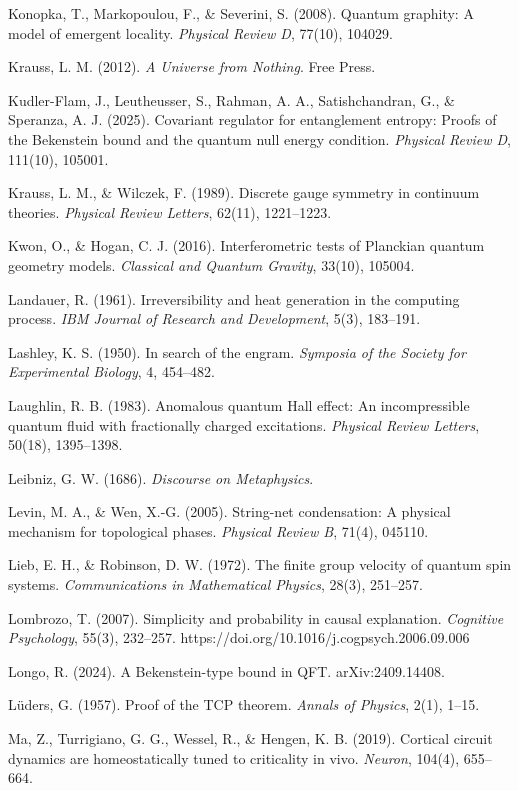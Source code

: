 \documentclass[
]{article}
\begin{document}
Konopka, T., Markopoulou, F., \& Severini, S. (2008). Quantum graphity:
A model of emergent locality. \emph{Physical Review D}, 77(10), 104029.

Krauss, L. M. (2012). \emph{A Universe from Nothing}. Free Press.

Kudler-Flam, J., Leutheusser, S., Rahman, A. A., Satishchandran, G., \&
Speranza, A. J. (2025). Covariant regulator for entanglement entropy:
Proofs of the Bekenstein bound and the quantum null energy condition.
\emph{Physical Review D}, 111(10), 105001.

Krauss, L. M., \& Wilczek, F. (1989). Discrete gauge symmetry in
continuum theories. \emph{Physical Review Letters}, 62(11), 1221--1223.

Kwon, O., \& Hogan, C. J. (2016). Interferometric tests of Planckian
quantum geometry models. \emph{Classical and Quantum Gravity}, 33(10),
105004.

Landauer, R. (1961). Irreversibility and heat generation in the
computing process. \emph{IBM Journal of Research and Development}, 5(3),
183--191.

Lashley, K. S. (1950). In search of the engram. \emph{Symposia of the
Society for Experimental Biology}, 4, 454--482.

Laughlin, R. B. (1983). Anomalous quantum Hall effect: An incompressible
quantum fluid with fractionally charged excitations. \emph{Physical
Review Letters}, 50(18), 1395--1398.

Leibniz, G. W. (1686). \emph{Discourse on Metaphysics}.

Levin, M. A., \& Wen, X.-G. (2005). String-net condensation: A physical
mechanism for topological phases. \emph{Physical Review B}, 71(4),
045110.

Lieb, E. H., \& Robinson, D. W. (1972). The finite group velocity of
quantum spin systems. \emph{Communications in Mathematical Physics},
28(3), 251--257.

Lombrozo, T. (2007). Simplicity and probability in causal explanation.
\emph{Cognitive Psychology}, 55(3), 232--257.
https://doi.org/10.1016/j.cogpsych.2006.09.006

Longo, R. (2024). A Bekenstein-type bound in QFT. arXiv:2409.14408.

Lüders, G. (1957). Proof of the TCP theorem. \emph{Annals of Physics},
2(1), 1--15.

Ma, Z., Turrigiano, G. G., Wessel, R., \& Hengen, K. B. (2019). Cortical
circuit dynamics are homeostatically tuned to criticality in vivo.
\emph{Neuron}, 104(4), 655--664.
\end{document}
